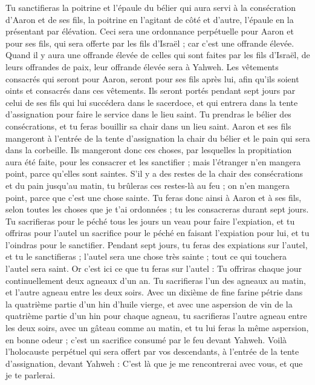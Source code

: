 \begin{multicols}{2}
Tu sanctifieras la poitrine et l’épaule du bélier qui aura servi à la consécration d’Aaron et de ses fils, la poitrine en l’agitant de côté et d’autre, l’épaule en la présentant par élévation\FTNT{}.
Ceci sera une ordonnance perpétuelle pour Aaron et pour ses fils, qui sera offerte par les fils d'Israël ; car c'est une offrande élevée. Quand il y aura une offrande élevée de celles qui sont faites par les fils d'Israël, de leurs offrandes de paix, leur offrande élevée sera à Yahweh.
Les vêtements consacrés qui seront pour Aaron, seront pour ses fils après lui, afin qu'ils soient oints et consacrés dans ces vêtements.
Ils seront portés pendant sept jours par celui de ses fils qui lui succédera dans le sacerdoce, et qui entrera dans la tente d’assignation pour faire le service dans le lieu saint.
Tu prendras le bélier des consécrations, et tu feras bouillir sa chair dans un lieu saint.
Aaron et ses fils mangeront à l'entrée de la tente d'assignation la chair du bélier et le pain qui sera dans la corbeille.
Ils mangeront donc ces choses, par lesquelles la propitiation aura été faite, pour les consacrer et les sanctifier ; mais l'étranger n'en mangera point, parce qu'elles sont saintes.
S'il y a des restes de la chair des consécrations et du pain jusqu’au matin, tu brûleras ces restes-là au feu ; on n'en mangera point, parce que c'est une chose sainte.
Tu feras donc ainsi à Aaron et à ses fils, selon toutes les choses que je t'ai ordonnées ; tu les consacreras durant sept jours\FTNT{}.
Tu sacrifieras pour le péché tous les jours un veau pour faire l’expiation, et tu offriras pour l'autel un sacrifice pour le péché en faisant l’expiation pour lui, et tu l'oindras pour le sanctifier\FTNT{}.
Pendant sept jours, tu feras des expiations sur l'autel, et tu le sanctifieras ; l'autel sera une chose très sainte ; tout ce qui touchera l'autel sera saint\FTNT{}.
Or c'est ici ce que tu feras sur l'autel : Tu offriras chaque jour continuellement deux agneaux d'un an.
Tu sacrifieras l'un des agneaux au matin, et l'autre agneau entre les deux soirs.
Avec un dixième de fine farine pétrie dans la quatrième partie d'un hin d’huile vierge, et avec une aspersion de vin de la quatrième partie d'un hin pour chaque agneau,
tu sacrifieras l'autre agneau entre les deux soirs, avec un gâteau comme au matin, et tu lui feras la même aspersion, en bonne odeur ; c'est un sacrifice consumé par le feu devant Yahweh.
Voilà l’holocauste perpétuel qui sera offert par vos descendants, à l’entrée de la tente d’assignation, devant Yahweh : C’est là que je me rencontrerai avec vous, et que je te parlerai.

\end{multicols}
